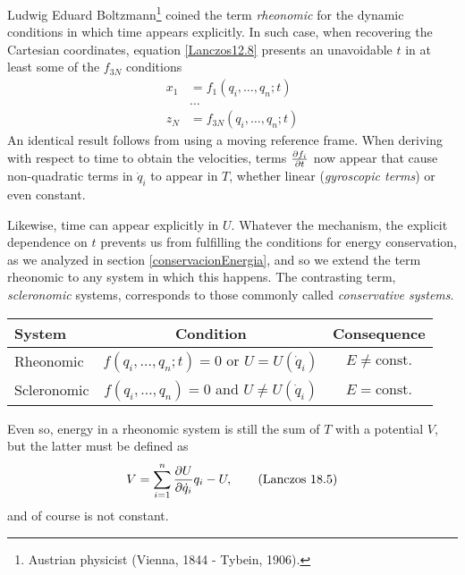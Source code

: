 \documentclass[12pt, english, a4paper]{article}
\begin{document}
Ludwig Eduard Boltzmann\footnote{Austrian physicist (Vienna, 1844 - Tybein, 1906).} coined the term \emph{rheonomic} for the dynamic conditions in which time appears explicitly.
In such case, when recovering the Cartesian coordinates, equation \eqref{Lanczos12.8} presents an unavoidable \(t\) in at least some of the \(f_{3N}\) conditions
\begin{equation}\label{Lanczos18.3}
	\begin{aligned}
		x_1 &= f_1(q_i, \ldots, q_n; t) \\
		& \ldots \\
		z_N &= f_{3N}(q_i, \ldots, q_n; t)
	\end{aligned}
	\tag{Lanczos 18.3}
\end{equation}
An identical result follows from using a moving reference frame.
When deriving with respect to time to obtain the velocities, terms \(\pdv{f_i}{t}\) now appear that cause non-quadratic terms in \(\dot{q}_i\) to appear in \(T\), whether linear (\emph{gyroscopic terms}) or even constant.

Likewise, time can appear explicitly in \(U\).
Whatever the mechanism, the explicit dependence on \(t\) prevents us from fulfilling the conditions for energy conservation, as we analyzed in section \ref{conservacionEnergia}, and so we extend the term rheonomic to any system in which this happens.
The contrasting term, \emph{scleronomic} systems, corresponds to those commonly called \emph{conservative systems}.

\begin{center}
  \begin{tabular}{lcc}
    \toprule
	System & Condition & Consequence\\
	\midrule
	Rheonomic & \(f(q_i,\ldots,q_n;t)= 0\) or \(U=U(\dot{q}_i)\) & \(E \neq \mathrm{const.}\) \\
	Scleronomic & \(f(q_i,\ldots,q_n)= 0\) and \(U\neq U(\dot{q}_i)\)  & \(E =\mathrm{const.}\) \\
    \bottomrule
  \end{tabular}
\end{center}

Even so, energy in a rheonomic system is still the sum of \(T\) with a potential \(V\), but the latter must be defined as
\begin{equation}\label{Lanczos18.5}
	V= \sum_{i=1}^n \pdv{U}{\dot{q}_i} q_i - U ,
	\tag{Lanczos 18.5}
\end{equation}
and of course is not constant.
\end{document}
